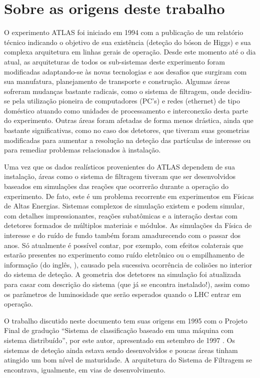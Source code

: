 \section{Sobre as origens deste trabalho}

O experimento ATLAS foi iniciado em 1994 com a publicação de um relatório
técnico indicando o objetivo de sua existência (deteção do bóson de Higgs) e
sua complexa arquitetura em linhas gerais de operação. Desde este momento até
o dia atual, as arquiteturas de todos os sub-sistemas deste experimento foram
modificadas adaptando-se às novas tecnologias e aos desafios que surgiram com
sua manufatura, planejamento de transporte e construção. Algumas áreas
sofreram mudanças bastante radicais, como o sistema de filtragem, onde
decidiu-se pela utilização pioneira de computadores (PC's) e redes (ethernet)
de tipo doméstico atuando como unidades de processamento e interconexão desta
parte do experimento. Outras áreas foram afetadas de forma menos drástica,
ainda que bastante significativas, como no caso dos detetores, que tiveram
suas geometrias modificadas para aumentar a resolução na deteção das
partículas de interesse ou para remediar problemas relacionados à instalação.

Uma vez que os dados realísticos provenientes do ATLAS dependem de sua
instalação, áreas como o sistema de filtragem tiveram que ser desenvolvidos
baseados em simulações das reações que ocorrerão durante a operação do
experimento. De fato, este é um problema recorrente em experimentos em Físicas
de Altas Energias. Sistemas complexos de simulação existem e podem simular,
com detalhes impressionantes, reações subatômicas e a interação destas com
detetores formados de múltiplos materiais e módulos. As simulações da Física
de interesse e do ruído de fundo também foram amadurecendo com o passar dos
anos. Só atualmente é possível contar, por exemplo, com efeitos colaterais que
estarão presentes no experimento como ruído eletrônico ou o empilhamento de
informação (do inglês, ), causado pela sucessiva ocorrência de
colisões no interior do sistema de deteção. A geometria dos detetores na
simulação foi atualizada para casar com descrição do sistema (que já se
encontra instalado!), assim como os parâmetros de luminosidade que serão
esperados quando o LHC entrar em operação.

O trabalho discutido neste documento tem suas origens em 1995 com o Projeto
Final de gradução ``Sistema de classificação baseado em uma máquina com
sistema distribuído'', por este autor, apresentado em setembro de 1997
\cite{aa:projeto-final}. Os sistemas de deteção ainda estava sendo
desenvolvidos e poucas áreas tinham atingido um bom nível de maturidade. A
arquitetura do Sistema de Filtragem se encontrava, igualmente, em vias de
desenvolvimento.

